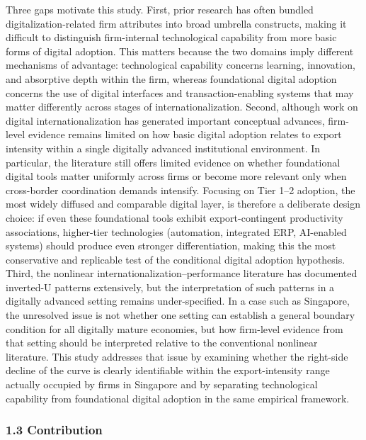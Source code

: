 \documentclass[
  12pt,a4paper]{article}
\begin{document}
Three gaps motivate this study. First, prior research has often bundled
digitalization-related firm attributes into broad umbrella constructs,
making it difficult to distinguish firm-internal technological
capability from more basic forms of digital adoption. This matters
because the two domains imply different mechanisms of advantage:
technological capability concerns learning, innovation, and absorptive
depth within the firm, whereas foundational digital adoption concerns
the use of digital interfaces and transaction-enabling systems that may
matter differently across stages of internationalization. Second,
although work on digital internationalization has generated important
conceptual advances, firm-level evidence remains limited on how basic
digital adoption relates to export intensity within a single digitally
advanced institutional environment. In particular, the literature still
offers limited evidence on whether foundational digital tools matter
uniformly across firms or become more relevant only when cross-border
coordination demands intensify. Focusing on Tier 1--2 adoption, the most
widely diffused and comparable digital layer, is therefore a deliberate
design choice: if even these foundational tools exhibit
export-contingent productivity associations, higher-tier technologies
(automation, integrated ERP, AI-enabled systems) should produce even
stronger differentiation, making this the most conservative and
replicable test of the conditional digital adoption hypothesis. Third,
the nonlinear internationalization--performance literature has
documented inverted-U patterns extensively, but the interpretation of
such patterns in a digitally advanced setting remains under-specified.
In a case such as Singapore, the unresolved issue is not whether one
setting can establish a general boundary condition for all digitally
mature economies, but how firm-level evidence from that setting should
be interpreted relative to the conventional nonlinear literature. This
study addresses that issue by examining whether the right-side decline
of the curve is clearly identifiable within the export-intensity range
actually occupied by firms in Singapore and by separating technological
capability from foundational digital adoption in the same empirical
framework.

\hypertarget{contribution}{%
\subsubsection{1.3 Contribution}\label{contribution}}
\end{document}
